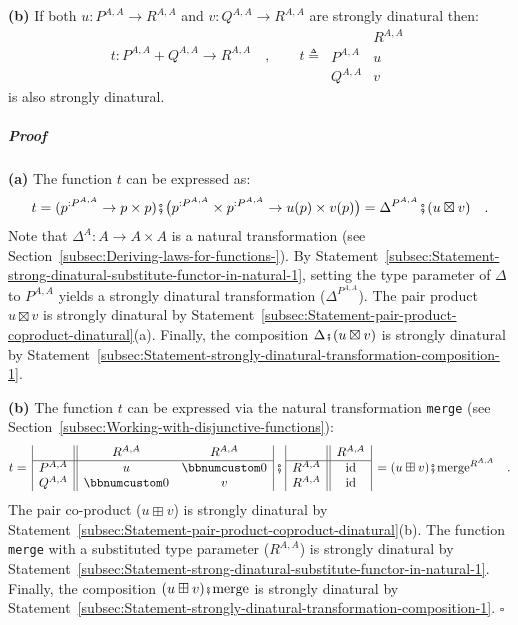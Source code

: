 \textbf{(b)} If both $u:P^{A,A}\rightarrow R^{A,A}$ and $v:Q^{A,A}\rightarrow R^{A,A}$
are strongly dinatural then:
\[
t:P^{A,A}+Q^{A,A}\rightarrow R^{A,A}\quad,\quad\quad t\triangleq\,\begin{array}{|c||c|}
 & R^{A,A}\\
\hline P^{A,A} & u\\
Q^{A,A} & v
\end{array}
\]
is also strongly dinatural.

\subparagraph{Proof}

\textbf{(a)} The function $t$ can be expressed as:
\[
t=(p^{:P^{A,A}}\rightarrow p\times p)\bef\big(p^{:P^{A,A}}\times p^{:P^{A,A}}\rightarrow u(p)\times v(p)\big)=\Delta^{P^{A,A}}\bef(u\boxtimes v)\quad.
\]
Note that $\Delta^{A}:A\rightarrow A\times A$ is a natural transformation
(see Section~\ref{subsec:Deriving-laws-for-functions-}). By Statement~\ref{subsec:Statement-strong-dinatural-substitute-functor-in-natural-1},
setting the type parameter of $\Delta$ to $P^{A,A}$ yields a strongly
dinatural transformation ($\Delta^{P^{A,A}}$). The pair product $u\boxtimes v$
is strongly dinatural by Statement~\ref{subsec:Statement-pair-product-coproduct-dinatural}(a).
Finally, the composition $\Delta\bef(u\boxtimes v)$ is strongly dinatural
by Statement~\ref{subsec:Statement-strongly-dinatural-transformation-composition-1}.

\textbf{(b)} The function $t$ can be expressed via the natural transformation
\lstinline!merge! (see Section~\ref{subsec:Working-with-disjunctive-functions}):
\[
t=\,\begin{array}{|c||cc|}
 & R^{A,A} & R^{A,A}\\
\hline P^{A,A} & u & \bbnum 0\\
Q^{A,A} & \bbnum 0 & v
\end{array}\,\bef\,\begin{array}{|c||c|}
 & R^{A,A}\\
\hline R^{A,A} & \text{id}\\
R^{A,A} & \text{id}
\end{array}\,=(u\boxplus v)\bef\text{merge}^{R^{A,A}}\quad.
\]
The pair co-product ($u\boxplus v$) is strongly dinatural by Statement~\ref{subsec:Statement-pair-product-coproduct-dinatural}(b).
The function \lstinline!merge! with a substituted type parameter
($R^{A,A}$) is strongly dinatural by Statement~\ref{subsec:Statement-strong-dinatural-substitute-functor-in-natural-1}.
Finally, the composition $(u\boxplus v)\bef\text{merge}$ is strongly
dinatural by Statement~\ref{subsec:Statement-strongly-dinatural-transformation-composition-1}.
$\square$


